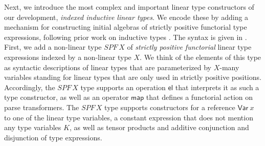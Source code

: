 \documentclass[acmsmall,nonacm]{acmart}
\newcommand{\SPF}{SPF}
\newcommand{\Var}{\mathsf{Var}}
\newcommand{\map}{\mathsf{map}}
\newcommand{\el}{\mathsf{el}}
\begin{document}
Next, we introduce the most complex and important linear type
constructors of our development, \emph{indexed inductive linear
types}. We encode these by adding a mechanism for constructing initial
algebras of strictly positive functorial type expressions, following
prior work on inductive types
\cite{nakov_quantitative_2022,altenkirch_indexed_2015}. The syntax is
given in . First, we add a non-linear type $\SPF\,X$ of
\emph{strictly positive functorial} linear type expressions indexed by
a non-linear type $X$. We think of the elements of this type as
syntactic descriptions of linear types that are parameterized by
$X$-many variables standing for linear types that are only used in
strictly positive positions. Accordingly, the $\SPF\,X$ type supports
an operation $\el$ that interprets it as such a type constructor, as
well as an operator $\map$ that defines a functorial action on parse
transformers. The $\SPF\,X$ type supports constructors for a reference
$\Var~x$ to one of the linear type variables, a constant expression
that does not mention any type variables $K$, as well as tensor
products and additive conjunction and disjunction of type expressions.
\end{document}
